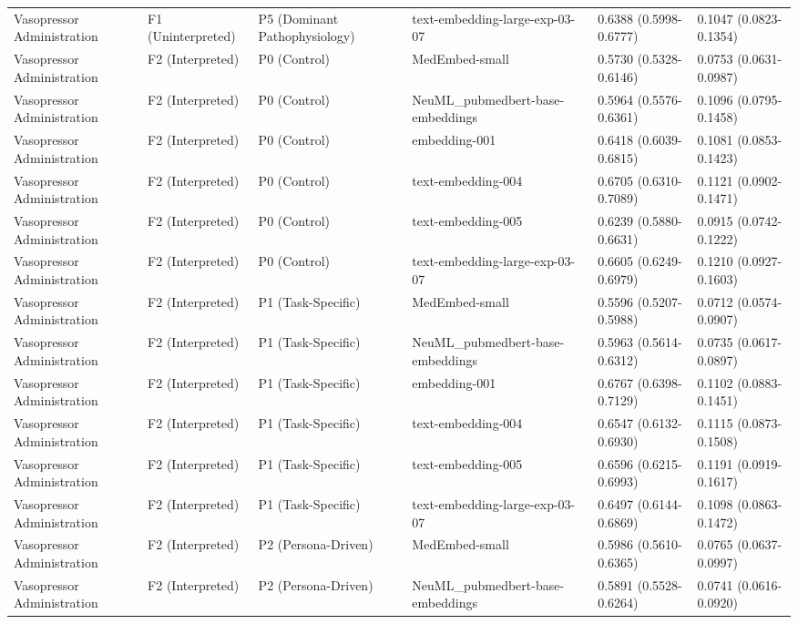 \begin{tabular}{llllll}
Vasopressor Administration & F1 (Uninterpreted) & P5 (Dominant Pathophysiology) & text-embedding-large-exp-03-07 & 0.6388 (0.5998-0.6777) & 0.1047 (0.0823-0.1354) \\
Vasopressor Administration & F2 (Interpreted) & P0 (Control) & MedEmbed-small & 0.5730 (0.5328-0.6146) & 0.0753 (0.0631-0.0987) \\
Vasopressor Administration & F2 (Interpreted) & P0 (Control) & NeuML\_pubmedbert-base-embeddings & 0.5964 (0.5576-0.6361) & 0.1096 (0.0795-0.1458) \\
Vasopressor Administration & F2 (Interpreted) & P0 (Control) & embedding-001 & 0.6418 (0.6039-0.6815) & 0.1081 (0.0853-0.1423) \\
Vasopressor Administration & F2 (Interpreted) & P0 (Control) & text-embedding-004 & 0.6705 (0.6310-0.7089) & 0.1121 (0.0902-0.1471) \\
Vasopressor Administration & F2 (Interpreted) & P0 (Control) & text-embedding-005 & 0.6239 (0.5880-0.6631) & 0.0915 (0.0742-0.1222) \\
Vasopressor Administration & F2 (Interpreted) & P0 (Control) & text-embedding-large-exp-03-07 & 0.6605 (0.6249-0.6979) & 0.1210 (0.0927-0.1603) \\
Vasopressor Administration & F2 (Interpreted) & P1 (Task-Specific) & MedEmbed-small & 0.5596 (0.5207-0.5988) & 0.0712 (0.0574-0.0907) \\
Vasopressor Administration & F2 (Interpreted) & P1 (Task-Specific) & NeuML\_pubmedbert-base-embeddings & 0.5963 (0.5614-0.6312) & 0.0735 (0.0617-0.0897) \\
Vasopressor Administration & F2 (Interpreted) & P1 (Task-Specific) & embedding-001 & 0.6767 (0.6398-0.7129) & 0.1102 (0.0883-0.1451) \\
Vasopressor Administration & F2 (Interpreted) & P1 (Task-Specific) & text-embedding-004 & 0.6547 (0.6132-0.6930) & 0.1115 (0.0873-0.1508) \\
Vasopressor Administration & F2 (Interpreted) & P1 (Task-Specific) & text-embedding-005 & 0.6596 (0.6215-0.6993) & 0.1191 (0.0919-0.1617) \\
Vasopressor Administration & F2 (Interpreted) & P1 (Task-Specific) & text-embedding-large-exp-03-07 & 0.6497 (0.6144-0.6869) & 0.1098 (0.0863-0.1472) \\
Vasopressor Administration & F2 (Interpreted) & P2 (Persona-Driven) & MedEmbed-small & 0.5986 (0.5610-0.6365) & 0.0765 (0.0637-0.0997) \\
Vasopressor Administration & F2 (Interpreted) & P2 (Persona-Driven) & NeuML\_pubmedbert-base-embeddings & 0.5891 (0.5528-0.6264) & 0.0741 (0.0616-0.0920) \\

\end{tabular}
